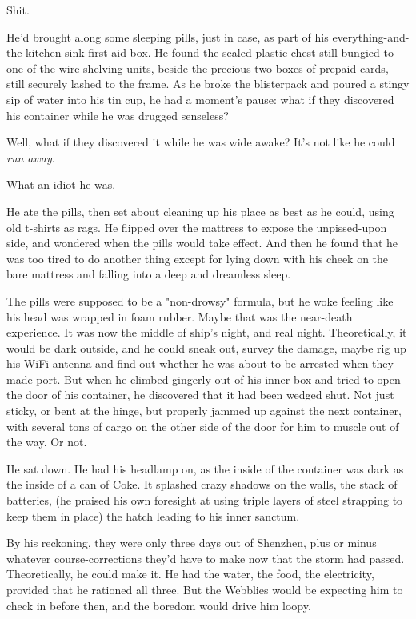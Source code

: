 Shit.

He'd brought along some sleeping pills, just in case, as part of
his everything-and-the-kitchen-sink first-aid box. He found the
sealed plastic chest still bungied to one of the wire shelving
units, beside the precious two boxes of prepaid cards, still
securely lashed to the frame. As he broke the blisterpack and
poured a stingy sip of water into his tin cup, he had a moment's
pause: what if they discovered his container while he was drugged
senseless?

Well, what if they discovered it while he was wide awake? It's not
like he could \emph{run away}.

What an idiot he was.

He ate the pills, then set about cleaning up his place as best as
he could, using old t-shirts as rags. He flipped over the mattress
to expose the unpissed-upon side, and wondered when the pills would
take effect. And then he found that he was too tired to do another
thing except for lying down with his cheek on the bare mattress and
falling into a deep and dreamless sleep.

The pills were supposed to be a "non-drowsy" formula, but he woke
feeling like his head was wrapped in foam rubber. Maybe that was
the near-death experience. It was now the middle of ship's night,
and real night. Theoretically, it would be dark outside, and he
could sneak out, survey the damage, maybe rig up his WiFi antenna
and find out whether he was about to be arrested when they made
port. But when he climbed gingerly out of his inner box and tried
to open the door of his container, he discovered that it had been
wedged shut. Not just sticky, or bent at the hinge, but properly
jammed up against the next container, with several tons of cargo on
the other side of the door for him to muscle out of the way. Or
not.

He sat down. He had his headlamp on, as the inside of the container
was dark as the inside of a can of Coke. It splashed crazy shadows
on the walls, the stack of batteries, (he praised his own foresight
at using triple layers of steel strapping to keep them in place)
the hatch leading to his inner sanctum.

By his reckoning, they were only three days out of Shenzhen, plus
or minus whatever course-corrections they'd have to make now that
the storm had passed. Theoretically, he could make it. He had the
water, the food, the electricity, provided that he rationed all
three. But the Webblies would be expecting him to check in before
then, and the boredom would drive him loopy.

